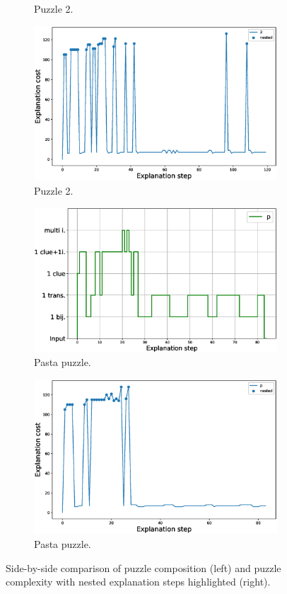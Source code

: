 \begin{figure}[t!]
\begin{subfigure}{.5\textwidth}
				\caption{Puzzle 2.}
				\label{fig:composition_puzzle:p2}
		\end{subfigure}%
		\begin{subfigure}{.5\textwidth}
				\centering
				\includegraphics[width=0.84\linewidth]{figures/2.eps}
				\caption{Puzzle 2.}
				\label{fig:cost_puzzle:p2}
		\end{subfigure}
		\begin{subfigure}{.5\textwidth}
				\centering
				\includegraphics[width=0.9\linewidth]{figures/plot_cost_steps_p.eps}
				\caption{Pasta puzzle.}
				\label{fig:composition_puzzle:pasta}
		\end{subfigure}%
		\begin{subfigure}{.5\textwidth}
				\centering
				\includegraphics[width=0.84\linewidth]{figures/p.eps}
				\caption{Pasta puzzle.}
				\label{fig:cost_puzzle:pasta}
		\end{subfigure}
		\caption{Side-by-side comparison of puzzle composition (left) and puzzle complexity with nested explanation steps highlighted (right).}
		\label{fig:steps}
\end{figure}


